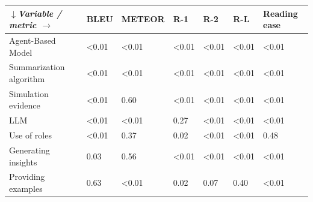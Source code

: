 \begin{tabular}{|l|l|l|l|l|l|l|}
\hline
\textit{$\downarrow$Variable / metric $\rightarrow$} & BLEU & METEOR & R-1 & R-2 & R-L & Reading ease \\
 \hline
 Agent-Based Model & \textless{}0.01 & \textless{}0.01 & \textless{}0.01 & \textless{}0.01 & \textless{}0.01 & \textless{}0.01 \\
 \hline
 Summarization algorithm & \textless{}0.01 & \textless{}0.01 & \textless{}0.01 & \textless{}0.01 & \textless{}0.01 & \textless{}0.01 \\
 \hline
 Simulation evidence & \textless{}0.01 & 0.60 & \textless{}0.01 & \textless{}0.01 & \textless{}0.01 & \textless{}0.01 \\
 \hline
 LLM & \textless{}0.01 & \textless{}0.01 & 0.27 & \textless{}0.01 & \textless{}0.01 & \textless{}0.01 \\
 \hline
 Use of roles & \textless{}0.01 & 0.37 & 0.02 & \textless{}0.01 & \textless{}0.01 & 0.48 \\
 \hline
 Generating insights & 0.03 & 0.56 & \textless{}0.01 & \textless{}0.01 & \textless{}0.01 & \textless{}0.01 \\
 \hline
 Providing examples & 0.63 & \textless{}0.01 & 0.02 & 0.07 & 0.40 & \textless{}0.01 \\
\hline
\end{tabular}
